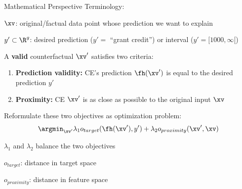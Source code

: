 \documentclass[10pt,compress,t,notes=noshow, xcolor=table]{beamer}
\begin{document}






\begin{framev}[align=top]{Mathematical Perspective}
Terminology:
\begin{itemizeM}
\item $\xv$: original/factual data point whose prediction we want to explain
\item $y' \subset \R^g$: desired prediction ($y' =$ ``grant credit'') or interval ($y' = [1000, \infty[$)
\end{itemizeM}
\pause
\spacer[0.25]
A \textbf{valid} counterfactual $\xv'$ satisfies two criteria:
\begin{enumerate}
\item \textbf{Prediction validity:} CE's prediction $\fh(\xv')$ is equal to the desired prediction $y'$
\item \textbf{Proximity:} CE $\xv'$ is as close as possible to the original input $\xv$
\end{enumerate}
\pause
\spacer[0.25]
Reformulate these two objectives as optimization problem:\\
\spacer[0.25]
$$
\argmin_{\xv'} \lambda_1 o_{target}(\fh(\xv'), y') + \lambda_2 o_{proximity}(\xv', \xv)
$$
\begin{itemizeM}
\item $\lambda_1$ and $\lambda_2$ balance the two objectives
\item $o_{target}$: distance in target space
\item $o_{proximity}$: distance in feature space
\end{itemizeM}
\end{framev}
\end{document}
